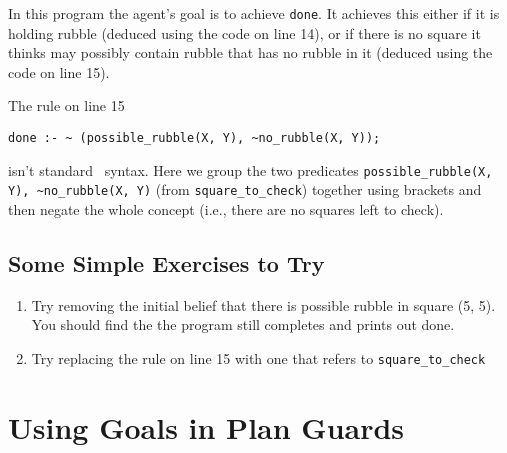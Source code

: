 \documentclass[a4]{article}
\begin{document}
In this program the agent's goal is to achieve \lstinline{done}.  It achieves this either if it is holding rubble (deduced using the code on line 14), or if there is no square it thinks may possibly contain rubble that has no rubble in it (deduced using the code on line 15).

\begin{sloppypar}
The rule on line 15
\begin{verbatim}
done :- ~ (possible_rubble(X, Y), ~no_rubble(X, Y));
\end{verbatim}
isn't standard \prolog\ syntax.  Here we group the two predicates \lstinline{possible_rubble(X, Y), ~no_rubble(X, Y)} (from \lstinline{square_to_check}) together using brackets and then negate the whole concept (i.e., there are no squares left to check).
\end{sloppypar}

\subsection{Some Simple Exercises to Try}
\begin{enumerate}
\item Try removing the initial belief that there is possible rubble in square (5, 5).  You should find the the program still completes and prints out done.
\item Try replacing the rule on line 15 with one that refers to \lstinline{square_to_check}
\end{enumerate}



\section{Using Goals in Plan Guards}
\end{document}
